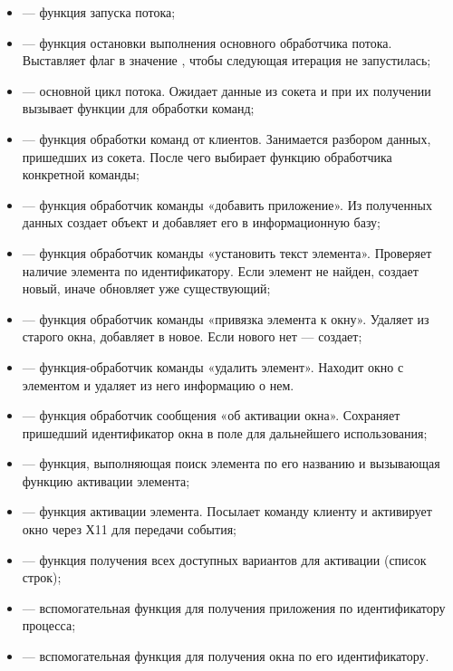 \begin{itemize}
    \item {} — функция запуска потока;
    \item {} — функция остановки выполнения основного обработчика
        потока. Выставляет флаг  в значение , чтобы
        следующая итерация не запустилась;
    \item {} — основной цикл потока. Ожидает данные из сокета и при
        их получении вызывает функции для обработки команд;
    \item {} — функция обработки команд от клиентов.
        Занимается разбором данных, пришедших из сокета. После чего
        выбирает функцию обработчика конкретной команды;
    \item {} — функция обработчик команды «добавить
        приложение». Из полученных данных создает объект  и добавляет
        его в информационную базу;
    \item {} — функция обработчик команды «установить
        текст элемента». Проверяет наличие элемента по идентификатору. Если
        элемент не найден, создает новый, иначе обновляет уже существующий;
    \item {} — функция обработчик команды «привязка
        элемента к окну». Удаляет из старого окна, добавляет в новое. Если
        нового нет — создает;
    \item {} — функция-обработчик команды «удалить элемент».
        Находит окно с элементом и удаляет из него информацию о нем.
    \item {} — функция обработчик сообщения «об активации окна».
        Сохраняет пришедший идентификатор окна в поле 
        для дальнейшего использования;
    \item {} — функция, выполняющая поиск элемента по его
        названию и вызывающая функцию активации элемента;
    \item {} — функция активации элемента. Посылает
        команду клиенту и активирует окно через Х11 для передачи события;
    \item {} — функция получения всех доступных вариантов для
        активации (список строк);
    \item {} — вспомогательная функция для получения приложения
        по идентификатору процесса;
    \item {} — вспомогательная функция для получения
        окна по его идентификатору.
\end{itemize}

